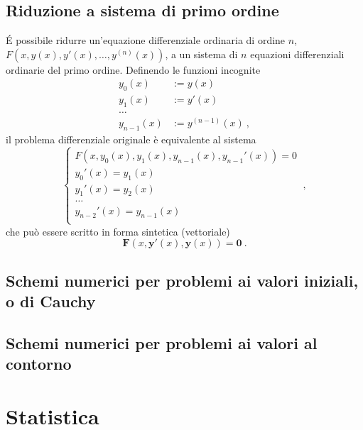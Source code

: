 \section{Riduzione a sistema di primo ordine}
\'E possibile ridurre un'equazione differenziale ordinaria di ordine $n$, $F(x,y(x),y'(x),\dots,y^{(n)}(x))$, a un sistema di $n$ equazioni differenziali ordinarie del primo ordine. Definendo le funzioni incognite
\begin{equation}
\begin{aligned}
    y_0(x) & := y(x) \\
    y_1(x) & := y'(x) \\
    \dots \\
    y_{n-1}(x) & := y^{(n-1)}(x) \ ,
\end{aligned}
\end{equation}
il problema differenziale originale è equivalente al sistema
\begin{equation}
    \begin{cases}
        F(x,y_0(x),y_1(x),y_{n-1}(x), y_{n-1}'(x)) = 0 \\
        y_0'(x) = y_1(x) \\
        y_1'(x) = y_2(x) \\
        \dots \\
        y_{n-2}'(x) = y_{n-1}(x) \\
    \end{cases} \ ,
\end{equation}
che può essere scritto in forma sintetica (vettoriale)
\begin{equation}
    \mathbf{F}(x, \mathbf{y}'(x), \mathbf{y}(x)) = \mathbf{0} \ .
\end{equation}

\section{Schemi numerici per problemi ai valori iniziali, o di Cauchy}
\section{Schemi numerici per problemi ai valori al contorno}

\chapter{Statistica}


